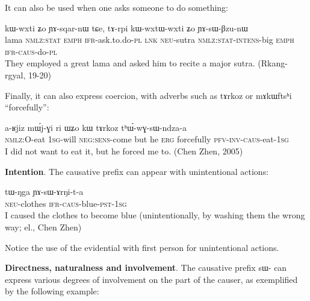 \documentclass[oldfontcommands,oneside,a4paper,11pt]{article}
\newcommand{\ipa}[1]{{\phon \mbox{#1}}} %
\newcommand{\sg}{\textsc{sg}}
\newcommand{\pl}{\textsc{pl}}
\newcommand{\pfv}{\textsc{pfv}}
\newcommand{\auto}{\textsc{autoben}}
\newcommand{\caus}{\textsc{caus}}
\newcommand{\lnk}{\textsc{lnk}}
\newcommand{\erg}{\textsc{erg}}
\newcommand{\emphat}{\textsc{emph}}
\newcommand{\evd}{\textsc{ifr}}
\newcommand{\intens}{\textsc{intens}}
\newcommand{\inv}{\textsc{inv}}
\newcommand{\negat}{\textsc{neg}}
\newcommand{\neu}{\textsc{neu}}
\newcommand{\nmlz}{\textsc{nmlz}}
\newcommand{\poss}{\textsc{poss}}
\newcommand{\pst}{\textsc{pst}}
\newcommand{\stat}{\textsc{stat}}
\begin{document}
 It can also be used when one asks someone to do something:
 \begin{exe}
\ex 
\gll  \ipa{βlama} 	\ipa{kɯ-wxti} 	\ipa{ʑo} 	\ipa{ɲɤ-sqar-nɯ} 	\ipa{tɕe,} 	\ipa{tɤ-rpi} 	\ipa{kɯ-wxtɯ-wxti} 	\ipa{ʑo} 	\ipa{ɲɤ-sɯ-βzu-nɯ}  \\
lama \nmlz{}:\stat{} \emphat{} \evd{}-ask.to.do-\pl{} \lnk{} \neu{}-sutra \nmlz{}:\stat{}-\intens{}-big \emphat{} \evd{}-\caus{}-do-\pl{} \\
 \glt   They employed a great lama and asked him to recite a major sutra. (Rkang-rgyal, 19-20)
\end{exe}

Finally, it can also express coercion, with adverbs such as \ipa{tɤrkoz} 	or \ipa{mɤkɯftsʰi} ``forcefully'':
 \begin{exe}
\ex 
\gll \ipa{kɤ-ndza} 	\ipa{a-ʁjiz} 	\ipa{mɯ́j-ɣi} 	\ipa{ri} 	\ipa{ɯʑo} 	\ipa{kɯ} 	\ipa{tɤrkoz} 	\ipa{tʰɯ́-wɣ-sɯ-ndza-a} \\
\nmlz{}:O-eat 1\sg{}-will \negat{}:\textsc{sens}-come but he \erg{} forcefully \pfv{}-\inv{}-\caus{}-eat-1\sg{} \\
 \glt   I did not want to eat it, but he forced me to. (Chen Zhen, 2005)
\end{exe}

 
   \textbf{Intention}. The causative prefix can appear with unintentional actions:
 \begin{exe}
\ex 
\gll 
\ipa{tɯ-ŋga} 	\ipa{ɲɤ-sɯ-ɤrŋi-t-a} \\
	\neu{}-clothes \evd{}-\caus{}-blue-\pst{}-1\sg{} \\
 \glt   I caused the clothes to become blue (unintentionally, by washing them the wrong way; el., Chen Zhen)
\end{exe}
Notice the use of the evidential with first person for unintentional actions.
 	

   \textbf{Directness, naturalness and involvement}.  The causative prefix \ipa{sɯ-} can express various degrees of involvement on the part of the causer, as exemplified by the following example:
 
\end{document}
